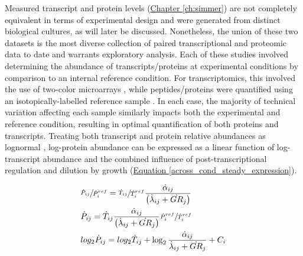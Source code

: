 Measured transcript \cite{Brauer:2008jn} and protein levels (\hyperref[ch:simmer]{Chapter \ref{ch:simmer}}) are not completely equivalent in terms of experimental design and were generated from distinct biological cultures, as will later be discussed. Nonetheless, the union of these two datasets is the most diverse collection of paired transcriptional and proteomic data to date and warrants exploratory analysis.  Each of these studies involved determining the abundance of transcripts/proteins at experimental conditions by comparison to an internal reference condition. For transcriptomics, this involved the use of two-color microarrays \cite{Quackenbush:2002kl}, while peptides/proteins were quantified using an isotopically-labelled reference sample \cite{Ong:2002tf, Costenoble:2011hia}.  In each case, the majority of technical variation affecting each sample similarly impacts both the experimental and reference condition, resulting in optimal quantification of both proteins and transcripts. Treating both transcript and protein relative abundances as lognormal \cite{Quackenbush:2002kl, Cox:2008ir}, log-protein abundance can be expressed as a linear function of log-transcript abundance and the combined influence of post-transcriptional regulation and dilution by growth (\hyperref[across_cond_steady_expression]{Equation \ref{across_cond_steady_expression}}).

\begin{align}
&\sfrac{\dot{P}_{ij}}{\dot{P}^{ref}_{i}} = \sfrac{\dot{T}_{ij}}{\dot{T}^{ref}_{i}}\frac{\dot{\alpha}_{ij}}{\left(\dot{\lambda}_{ij} + \dot{GR}_{j}\right)}\notag\\
&\dot{P}_{ij} = \dot{T}_{ij}\frac{\dot{\alpha}_{ij}}{\left(\dot{\lambda}_{ij} + \dot{GR}_{j}\right)}\sfrac{\dot{P}^{ref}_{i}}{\dot{T}^{ref}_{i}}\notag\\
&log_{2}\dot{P}_{ij} = log_{2}\dot{T}_{ij} + \log_{2}\frac{\dot{\alpha}_{ij}}{\dot{\lambda}_{ij} + \dot{GR}_{j}} + C_{i}\label{across_cond_steady_expression}
\end{align}

